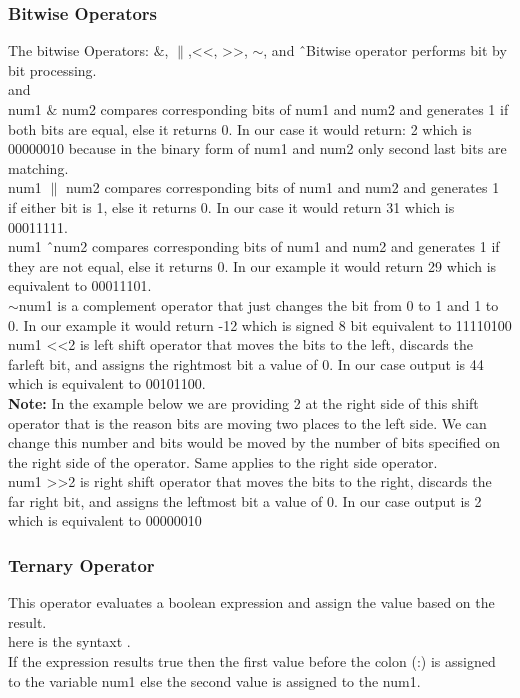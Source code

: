 \documentclass[11pt, a4paper]{article}
\begin{document}
\subsubsection{Bitwise Operators}
The bitwise Operators: $\&$, $\|$,\textless\textless, \textgreater\textgreater,
$\sim$, and \^\
Bitwise operator performs bit by bit processing.\\
 and \\
num1 $\&$ num2 compares corresponding bits of num1 and num2 and generates 1 if both bits
are equal, else it returns 0. In our case it would return: 2 which is 00000010 because
in the binary form of num1 and num2 only second last bits are matching.\\
num1 $\|$ num2 compares corresponding bits of num1 and num2 and generates 1 if either
bit is 1, else it returns 0. In our case it would return 31 which is 00011111.\\
num1 \^\ num2 compares corresponding bits of num1 and num2 and generates 1 if they
are not equal, else it returns 0. In our example it would return 29 which is
equivalent to 00011101.\\
$\sim$num1 is a complement operator that just changes the bit from 0 to 1 and 1 to 0.
In our example it would return -12 which is signed 8 bit equivalent to 11110100\\
num1 \textless\textless 2 is left shift operator that moves the bits to the left,
discards the farleft bit, and assigns the rightmost bit a value of 0. In our case output is 44 which
is equivalent to 00101100.\\
\textbf{Note:} In the example below we are providing 2 at the right side of this shift operator
that is the reason bits are moving two places to the left side. We can change this
number and bits would be moved by the number of bits specified on the right side
of the operator. Same applies to the right side operator.\\
num1 \textgreater\textgreater 2 is right shift operator that moves the bits to the right, discards
the far right bit, and assigns the leftmost bit a value of 0. In our case
output is 2 which is equivalent to 00000010


\subsubsection{Ternary Operator}
This operator evaluates a boolean expression and assign the value based on the result.\\
here is the syntaxt
.\\
If the expression results true then the first value before the colon (:)
is assigned to the variable num1 else the second value is assigned to the num1.

\end{document}
